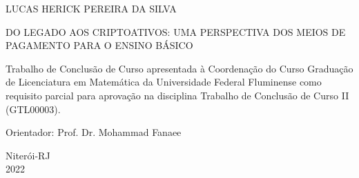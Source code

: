 
\setcounter{page}{1}

\begin{center}
	
	LUCAS HERICK PEREIRA DA SILVA	
	
	\vfill
	
\uppercase{Do legado aos criptoativos: uma perspectiva dos meios de pagamento para o ensino b\'asico} 
	\vspace{3.0cm}
	
	\begin{flushright}
		\begin{minipage}{7.75 cm} %
			\nohyphens{
			Trabalho de Conclusão de Curso apresentada à Coordenação do Curso Graduação de Licenciatura em Matemática da Universidade Federal Fluminense como requisito parcial para aprovação na disciplina Trabalho de Conclusão de Curso II (GTL00003).
		}
			
			
		\end{minipage}
	\end{flushright}
	
	\vspace{3.0cm}
	
	Orientador: Prof. Dr. Mohammad Fanaee
	
	\vfill
	
	Niterói-RJ\\2022
	
\end{center}
